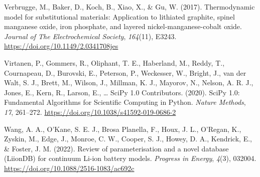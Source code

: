 \documentclass[
]{article}
\newlength{\cslhangindent}
\newenvironment{CSLReferences}[2] %
 {\begin{list}{}{%
  \setlength{\itemindent}{0pt}
  \setlength{\leftmargin}{0pt}
  \setlength{\parsep}{0pt}
  \ifodd #1
   \setlength{\leftmargin}{\cslhangindent}
   \setlength{\itemindent}{-1\cslhangindent}
  \fi
  \setlength{\itemsep}{#2\baselineskip}}}
 {\end{list}}
\begin{document}
\begin{CSLReferences}{1}{0}
Verbrugge, M., Baker, D., Koch, B., Xiao, X., \& Gu, W. (2017).
Thermodynamic model for substitutional materials: Application to
lithiated graphite, spinel manganese oxide, iron phosphate, and layered
nickel-manganese-cobalt oxide. \emph{Journal of The Electrochemical
Society}, \emph{164}(11), E3243.
\url{https://doi.org/10.1149/2.0341708jes}

Virtanen, P., Gommers, R., Oliphant, T. E., Haberland, M., Reddy, T.,
Cournapeau, D., Burovski, E., Peterson, P., Weckesser, W., Bright, J.,
van der Walt, S. J., Brett, M., Wilson, J., Millman, K. J., Mayorov, N.,
Nelson, A. R. J., Jones, E., Kern, R., Larson, E., \ldots{} SciPy 1.0
Contributors. (2020). {{SciPy} 1.0: Fundamental Algorithms for
Scientific Computing in Python}. \emph{Nature Methods}, \emph{17},
261--272. \url{https://doi.org/10.1038/s41592-019-0686-2}

Wang, A. A., O'Kane, S. E. J., Brosa Planella, F., Houx, J. L., O'Regan,
K., Zyskin, M., Edge, J., Monroe, C. W., Cooper, S. J., Howey, D. A.,
Kendrick, E., \& Foster, J. M. (2022). Review of parameterisation and a
novel database {(LiionDB)} for continuum {Li-ion} battery models.
\emph{Progress in Energy}, \emph{4}(3), 032004.
\url{https://doi.org/10.1088/2516-1083/ac692c}

\end{CSLReferences}
\end{document}
